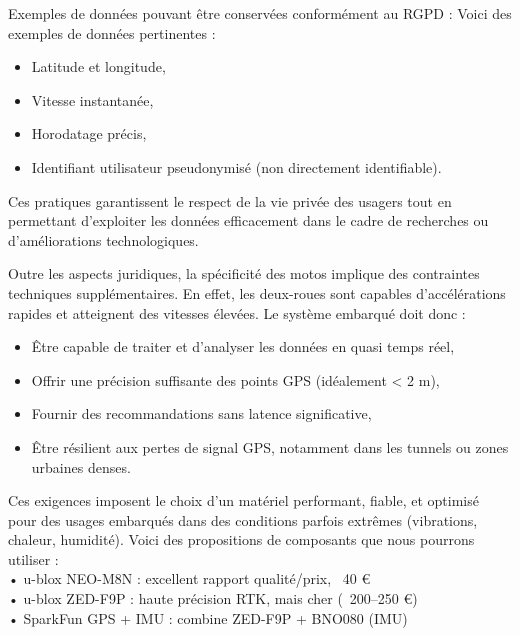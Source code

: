 Exemples de données pouvant être conservées conformément au RGPD : Voici des exemples de données pertinentes :
\begin{itemize}
\item Latitude et longitude,
\item Vitesse instantanée,
\item Horodatage précis,
\item Identifiant utilisateur pseudonymisé (non directement identifiable).
\end{itemize}

Ces pratiques garantissent le respect de la vie privée des usagers tout en permettant d’exploiter les données efficacement dans le cadre de recherches ou d’améliorations technologiques.

\vspace{0.5cm}
Outre les aspects juridiques, la spécificité des motos implique des contraintes techniques supplémentaires. En effet, les deux-roues sont capables d’accélérations rapides et atteignent des vitesses élevées. Le système embarqué doit donc :
\begin{itemize}
  \item Être capable de traiter et d’analyser les données en quasi temps réel,
  \item Offrir une précision suffisante des points GPS (idéalement < 2 m),
  \item Fournir des recommandations sans latence significative,
  \item Être résilient aux pertes de signal GPS, notamment dans les tunnels ou zones urbaines denses.
\end{itemize}
Ces exigences imposent le choix d’un matériel performant, fiable, et optimisé pour des usages embarqués dans des conditions parfois extrêmes (vibrations, chaleur, humidité).
\vspace{0.5cm}
Voici des propositions de composants que nous pourrons utiliser : 	\\
•	u-blox NEO-M8N : excellent rapport qualité/prix, ~40 € \\
•	u-blox ZED-F9P : haute précision RTK, mais cher (~200–250 €) \\
•	SparkFun GPS + IMU : combine ZED-F9P + BNO080 (IMU)
\vspace{0.5cm}

